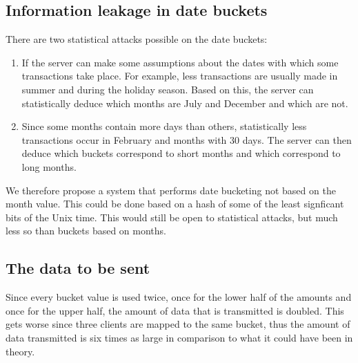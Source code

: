 \documentclass[a4paper]{article}
\begin{document}
	\subsection{Information leakage in date buckets}
    There are two statistical attacks possible on the date buckets:
    \begin{enumerate}
	    \item If the server can make some assumptions about the dates with which some transactions take place. For example, less transactions are usually made in summer and during the holiday season. Based on this, the server can statistically deduce which months are July and December and which are not.
        \item Since some months contain more days than others, statistically less transactions occur in February and months with 30 days. The server can then deduce which buckets correspond to short months and which correspond to long months.
    \end{enumerate}
    We therefore propose a system that performs date bucketing not based on the month value. This could be done based on a hash of some of the least signficant bits of the Unix time. This would still be open to statistical attacks, but much less so than buckets based on months.

    \subsection{The data to be sent}
    	Since every bucket value is used twice, once for the lower half of the amounts and once for the upper half, the amount of data that is transmitted is doubled. This gets worse since three clients are mapped to the same bucket, thus the amount of data transmitted is six times as large in comparison to what it could have been in theory.
    	


\end{document}

